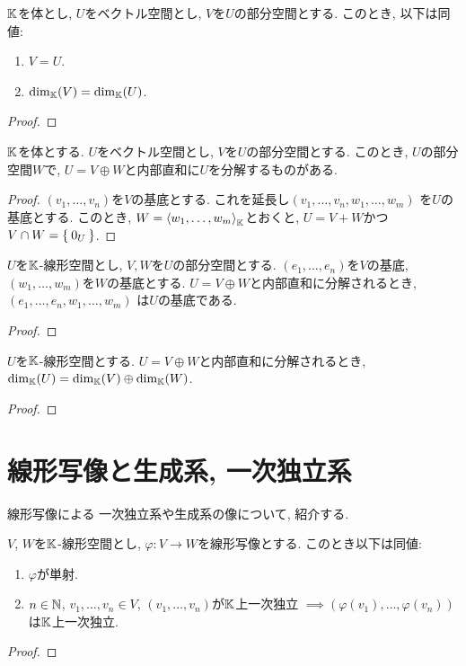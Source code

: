 \begin{cor}
$\mathbb{K}$を体とし,
  $U$をベクトル空間とし,
  $V$を$U$の部分空間とする.
  このとき, 以下は同値:
  \begin{enumerate}
   \item $V = U$.
   \item $\dim_{\mathbb{K}}(V) = \dim_{\mathbb{K}}(U)$.
  \end{enumerate}
\end{cor}
\begin{proof}\end{proof}

\begin{prop}
$\mathbb{K}$を体とする.
  $U$をベクトル空間とし, $V$を$U$の部分空間とする.
  このとき, $U$の部分空間$W$で,
  $U=V\oplus W$と内部直和に$U$を分解するものがある.
\end{prop}
\begin{proof}$(v_1,\ldots,v_n)$を$V$の基底とする.
これを延長し$(v_1,\ldots,v_n,w_1,\ldots,w_m)$
を$U$の基底とする.
このとき, $W=\Braket{w_1,\ldots,w_m}_{\mathbb{K}}$とおくと,
$U=V+W$かつ$V\cap W=\Set{0_U}$.
\end{proof}

\begin{prop}
  $U$を$\mathbb{K}$-線形空間とし,
  $V, W$を$U$の部分空間とする.
  $(e_1,\ldots,e_n)$を$V$の基底,
  $(w_1,\ldots,w_m)$を$W$の基底とする.
  $U=V\oplus W$と内部直和に分解されるとき,
  $(e_1,\ldots,e_n,w_1,\ldots,w_m)$
  は$U$の基底である.
\end{prop}
\begin{proof}\end{proof}

\begin{cor}
  $U$を$\mathbb{K}$-線形空間とする.
  $U=V\oplus W$と内部直和に分解されるとき,
  $\dim_{\mathbb{K}}(U)=\dim_{\mathbb{K}}(V)\oplus \dim_{\mathbb{K}}(W)$.
\end{cor}
\begin{proof}\end{proof}

\section{線形写像と生成系, 一次独立系}
\label{sec:basis:linmap}

線形写像による
一次独立系や生成系の像について,
紹介する.
\begin{prop}
  $V$, $W$を$\mathbb{K}$-線形空間とし,
  $\varphi\colon V\to W$を線形写像とする.
  このとき以下は同値:
  \begin{enumerate}
  \item $\varphi$が単射.
  \item $n\in \mathbb{N}$, $v_1,\ldots,v_n\in V$,
    $(v_1,\ldots,v_n)$が$\mathbb{K}$上一次独立
    $\implies (\varphi(v_1),\ldots,\varphi(v_n))$は$\mathbb{K}$上一次独立.
  \end{enumerate}
\end{prop}
\begin{proof}\end{proof}

